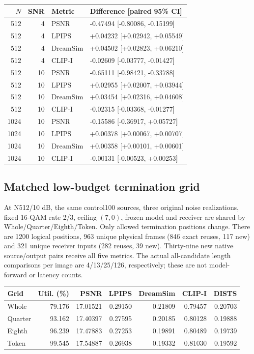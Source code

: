 \documentclass[10pt,letterpaper]{article}
\begin{document}
\begin{longtable}{@{}rrll@{}}\toprule
$N$ & SNR & Metric & Difference [paired 95\% CI]\\\midrule\endhead
512 & 4 & PSNR & -0.47494 [-0.80086, -0.15199]\\
512 & 4 & LPIPS & +0.04232 [+0.02942, +0.05549]\\
512 & 4 & DreamSim & +0.04502 [+0.02823, +0.06210]\\
512 & 4 & CLIP-I & -0.02609 [-0.03777, -0.01427]\\
512 & 10 & PSNR & -0.65111 [-0.98421, -0.33788]\\
512 & 10 & LPIPS & +0.02955 [+0.02007, +0.03944]\\
512 & 10 & DreamSim & +0.03454 [+0.02316, +0.04608]\\
512 & 10 & CLIP-I & -0.02315 [-0.03368, -0.01277]\\
1024 & 10 & PSNR & -0.15586 [-0.36917, +0.05727]\\
1024 & 10 & LPIPS & +0.00378 [+0.00067, +0.00707]\\
1024 & 10 & DreamSim & +0.00358 [+0.00101, +0.00601]\\
1024 & 10 & CLIP-I & -0.00131 [-0.00523, +0.00253]\\
\bottomrule\end{longtable}

\subsection{Matched low-budget termination grid}
At N512/10 dB, the same control100 sources, three original noise realizations, fixed 16-QAM rate 2/3, ceiling $(7,0)$, frozen model and receiver are shared by Whole/Quarter/Eighth/Token. Only allowed termination positions change. There are 1200 logical positions, 963 unique physical frames (846 exact reuses, 117 new) and 321 unique receiver inputs (282 reuses, 39 new). Thirty-nine new native source/output pairs receive all five metrics. The actual all-candidate length comparisons per image are 4/13/25/126, respectively; these are not model-forward or latency counts.

\begin{longtable}{@{}lrrrrrr@{}}\toprule
Grid & Util. (\%) & PSNR & LPIPS & DreamSim & CLIP-I & DISTS\\\midrule\endhead
Whole & 79.176 & 17.01521 & 0.29150 & 0.21809 & 0.79457 & 0.20703\\
Quarter & 93.162 & 17.40397 & 0.27595 & 0.20185 & 0.80128 & 0.19888\\
Eighth & 96.239 & 17.47883 & 0.27253 & 0.19891 & 0.80489 & 0.19739\\
Token & 99.545 & 17.54887 & 0.26938 & 0.19332 & 0.81030 & 0.19592\\
\bottomrule\end{longtable}
\end{document}
